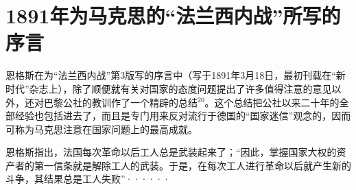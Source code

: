 \chapter{1891年为马克思的“法兰西内战”所写的序言} %

恩格斯在为“法兰西内战”第3版写的序言中（写于1891年3月18日，最初刊载在“新时代”杂志上），除了顺便就有关对国家的态度问题提出了许多值得注意的意见以外，还对巴黎公社的教训作了一个精辟的总结$^{20}$。这个总结把公社以来二十年的全部经验也包括进去了，而且是专门用来反对流行于德国的“国家迷信”观念的，因而可称为马克思注意在国家问题上的{\kaishu 最高成就}。

\pskip
\small
\leftskip=10mm

恩格斯指出，法国每次革命以后工人总是武装起来了；“因此，掌握国家大权的资产者的第一信条就是解除工人的武装。于是，在每次工人进行革命以后就产生新的斗争，其结果总是工人失败”······

\leftskip=0mm
\normalsize
\pskip

